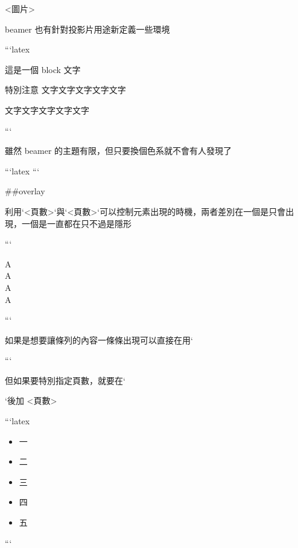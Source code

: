 \begin{markdown}
<圖片>

beamer 也有針對投影片用途新定義一些環境

```latex
\begin{block}{這是一個 block}
文字
\end{block}

\begin{alertblock}{特別注意}
文字文字文字文字文字
\end{alertblock}

\begin{examples}
文字文字文字文字文字
\end{examples}
```

雖然 beamer 的主題有限，但只要換個色系就不會有人發現了

```latex
```

##overlay

利用`\only<頁數>{}`與`\discover<頁數>{}`可以控制元素出現的時機，兩者差別在一個是只會出現，一個是一直都在只不過是隱形

```
\begin{center}
A\\
A\\
A\\
A\\
\end{center}
```

如果是想要讓條列的內容一條條出現可以直接在用` 
```

但如果要特別指定頁數，就要在`\item `後加 <頁數>

```latex
\begin{itemize}[<+->]
\item<1-> 一
\item<2> 二
\item<3-4> 三
\item<4> 四
\item<5> 五
\end{itemize} 
```
\end{markdown}